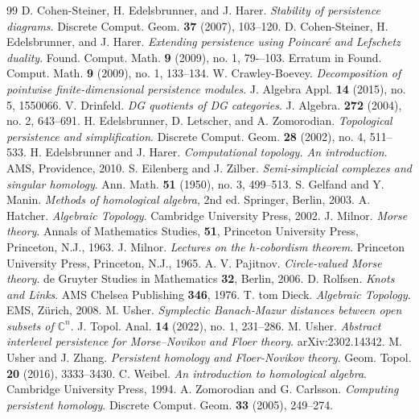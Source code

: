 \documentclass[11pt]{amsart}
\theoremstyle{definition}
\theoremstyle{remark}
\numberwithin{equation}{section}
\begin{document}
\begin{thebibliography}{99}
	 D. Cohen-Steiner, H. Edelsbrunner, and J. Harer. \emph{Stability of persistence diagrams}. Discrete Comput. Geom. \textbf{37} (2007), 103--120.
	 D. Cohen-Steiner, H. Edelsbrunner, and J. Harer. \emph{Extending persistence using Poincar\'e and Lefschetz duality}. Found. Comput. Math. \textbf{9} (2009), no. 1, 79-–103. Erratum in Found. Comput. Math. \textbf{9} (2009), no. 1, 133--134.
	 W. Crawley-Boevey. \emph{Decomposition of pointwise finite-dimensional persistence modules}. J. Algebra Appl. \textbf{14} (2015), no. 5, 1550066.
	 V. Drinfeld. \emph{
		DG quotients of DG categories}. J. Algebra. \textbf{272} (2004), no. 2, 643--691.
	 H. Edelsbrunner, D. Letscher, and A. Zomorodian. \emph{Topological persistence and simplification}. Discrete Comput. Geom. \textbf{28} (2002), no. 4, 511--533.
	 H. Edelsbrunner and J. Harer.  \emph{Computational topology. An introduction}. AMS, Providence, 2010. 
	 S. Eilenberg and J. Zilber. \emph{Semi-simplicial complexes and singular homology}. Ann. Math. \textbf{51} (1950), no. 3, 499--513.
	 S. Gelfand and Y. Manin. \emph{Methods of homological algebra}, 2nd ed. Springer, Berlin, 2003.
	 A. Hatcher. \emph{Algebraic Topology}. Cambridge University Press, 2002.
	 J. Milnor. \emph{Morse theory}.  Annals of Mathematics Studies, \textbf{51}, Princeton University Press, Princeton, N.J., 1963. 
	 J. Milnor. \emph{Lectures on the $h$-cobordism theorem}. Princeton University Press, Princeton, N.J., 1965.
	 A. V. Pajitnov. \emph{Circle-valued Morse theory}. de Gruyter Studies in Mathematics \textbf{32}, Berlin, 2006.
	 D. Rolfsen. \emph{Knots and Links}. AMS Chelsea Publishing \textbf{346}, 1976.
	 T. tom Dieck. \emph{Algebraic Topology}. EMS, Z\"urich, 2008.
	 M. Usher. \emph{Symplectic Banach-Mazur distances between open subsets of $\mathbb{C}^n$}. J. Topol. Anal. \textbf{14} (2022), no. 1, 231--286.
	 M. Usher. \emph{Abstract interlevel persistence for Morse--Novikov and Floer theory}. arXiv:2302.14342.
	 M. Usher and J. Zhang. \emph{Persistent homology and Floer-Novikov theory}. Geom. Topol. \textbf{20} (2016), 3333--3430.
	 C. Weibel. \emph{An introduction to homological algebra}. Cambridge University Press, 1994.
 A. Zomorodian and G. Carlsson. \emph{Computing persistent homology}. Discrete Comput. Geom. \textbf{33} (2005), 249--274.
	\end{thebibliography}
\end{document}

